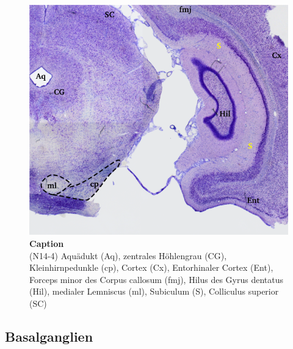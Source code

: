 \documentclass[12pt,a4paper,pdftex]{article}
\begin{document}
\begin{figure}
    \centering
    \includegraphics{pictures/Basalganglia/Subiculum.png}
    \caption[Caption]{\textbf{Caption}\\
    (N14-4)
    Aquädukt (Aq), zentrales Höhlengrau (CG), Kleinhirnpedunkle (cp), Cortex (Cx), Entorhinaler Cortex (Ent), Forceps minor des Corpus callosum (fmj), Hilus des Gyrus dentatus (Hil), medialer Lemniscus (ml), Subiculum (S), Colliculus superior (SC)}
    \label{fig:my_label}
\end{figure}

\subsection{Basalganglien} \label{subsec:basalganglien}
\end{document}
